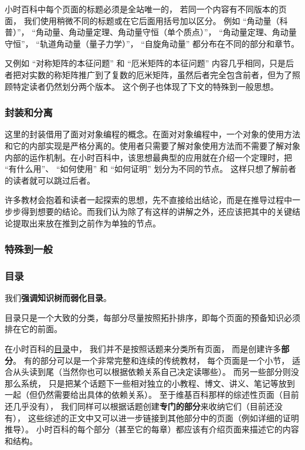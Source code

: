 小时百科中每个页面的标题必须是全站唯一的， 若同一个内容有不同版本的页面， 我们使用稍微不同的标题或在它后面用括号加以区分。 例如 “角动量（科普）”， “角动量、角动量定理、角动量守恒（单个质点）”， “角动量定理、角动量守恒”， “轨道角动量（量子力学）”， “自旋角动量” 都分布在不同的部分和章节。

又例如 “对称矩阵的本征问题” 和 “厄米矩阵的本征问题” 内容几乎相同，只是后者把对实数的称矩阵推广到了复数的厄米矩阵，虽然后者完全包含前者，但为了照顾特定读者仍然划分两个版本。 这个例子也体现了下文的特殊到一般思想。

\subsubsection{封装和分离}
这里的封装借用了面对对象编程的概念。在面对对象编程中，一个对象的使用方法和它的内部实现是严格分离的。使用者只需要了解对象使用方法而不需要了解对象内部的运作机制。在小时百科中，该思想最典型的应用就在介绍一个定理时，把 “有什么用”、 “如何使用” 和 “如何证明” 划分为不同的节点。 这样只想了解前者的读者就可以跳过后者。

许多教材会抱着和读者一起探索的思想，先不直接给出结论，而是在推导过程中一步步得到想要的结论。而我们认为除了有这样的讲解之外，还应该把其中的关键结论提取出来放在推到之前作为单独的节点。

\subsubsection{特殊到一般}

\subsubsection{目录}
我们\textbf{强调知识树而弱化目录}。 

目录只是一个大致的分类，每部分尽量按照拓扑排序，即每个页面的预备知识必须排在它的前面。

在小时百科的\href{http://wuli.wiki/online}{目录}中， 我们并不是按照话题来分类所有页面， 而是创建许多\textbf{部分}。 有的部分可以是一个非常完整和连续的传统教材， 每个页面是一个小节， 适合从头读到尾（当然你也可以根据依赖关系自己决定读哪些）。 而另一些部分则没那么系统， 只是把某个话题下一些相对独立的小教程、博文、讲义、笔记等放到一起（但仍然需要给出具体的依赖关系）。 至于维基百科那样的综述性页面（目前还几乎没有）， 我们同样可以根据话题创建\textbf{专门的部分}来收纳它们（目前还没有）， 这些综述的正文中又可以进一步链接到其他部分中的页面（例如详细的证明推导）。 小时百科的每个部分（甚至它的每章）都应该有介绍页面来描述它的内容和结构。

